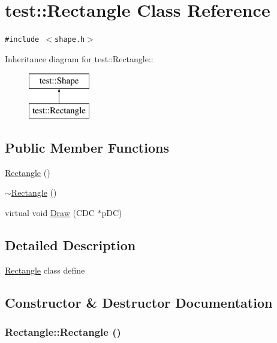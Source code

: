 \hypertarget{classtest_1_1Rectangle}{
\section{test::Rectangle Class Reference}
\label{classtest_1_1Rectangle}
}
{\tt \#include $<$shape.h$>$}

Inheritance diagram for test::Rectangle::\begin{figure}[H]
\begin{center}
\leavevmode
\includegraphics[height=2cm]{classtest_1_1Rectangle}
\end{center}
\end{figure}
\subsection*{Public Member Functions}
\begin{CompactItemize}
\item 
\hyperlink{classtest_1_1Rectangle_8a933e0ebd9e80ce91e61ffe87fd577e}{Rectangle} ()
\item 
\hyperlink{classtest_1_1Rectangle_494c076b13aadf26efdce07d23c61ddd}{$\sim$Rectangle} ()
\item 
virtual void \hyperlink{classtest_1_1Rectangle_22e5e5f9e3c7474d3586e1d7d36bb069}{Draw} (CDC $\ast$pDC)
\end{CompactItemize}


\subsection{Detailed Description}
\hyperlink{classtest_1_1Rectangle}{Rectangle} class define 

\subsection{Constructor \& Destructor Documentation}
\hypertarget{classtest_1_1Rectangle_8a933e0ebd9e80ce91e61ffe87fd577e}{
\subsubsection[Rectangle]{\setlength{\rightskip}{0pt plus 5cm}Rectangle::Rectangle ()}}
\label{classtest_1_1Rectangle_8a933e0ebd9e80ce91e61ffe87fd577e}


